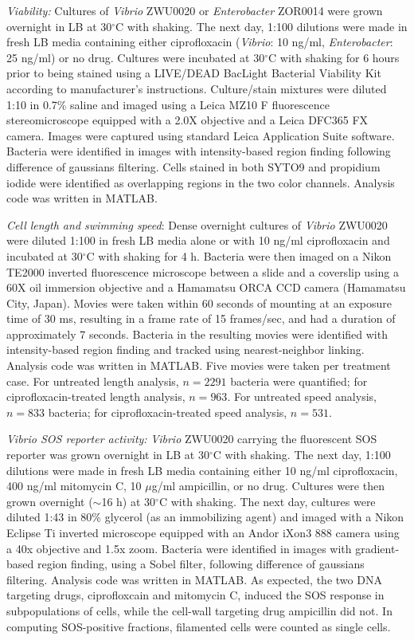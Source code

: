 \documentclass[12pt]{article}
\begin{document}
\textit{Viability:} Cultures of \textit{Vibrio} ZWU0020 or \textit{Enterobacter} ZOR0014 were grown overnight in LB at 30$^{\circ}$C with shaking. The next day, 1:100 dilutions were made in fresh LB media containing either ciprofloxacin (\textit{Vibrio}: 10 ng/ml, \textit{Enterobacter}: 25 ng/ml) or no drug. Cultures were incubated at 30$^{\circ}$C with shaking for 6 hours prior to being stained using a LIVE/DEAD BacLight Bacterial Viability Kit according to manufacturer's instructions. Culture/stain mixtures were diluted 1:10 in 0.7\% saline and imaged using a Leica MZ10 F fluorescence stereomicroscope equipped with a 2.0X objective and a Leica DFC365 FX camera. Images were captured using standard Leica Application Suite software. Bacteria were identified in images with intensity-based region finding following difference of gaussians filtering. Cells stained in both SYTO9 and propidium iodide were identified as overlapping regions in the two color channels. Analysis code was written in MATLAB.

\textit{Cell length and swimming speed}: Dense overnight cultures of \textit{Vibrio} ZWU0020 were diluted 1:100 in fresh LB media alone or with 10 ng/ml ciprofloxacin and incubated at 30$^{\circ}$C with shaking for 4 h. Bacteria were then imaged on a Nikon TE2000 inverted fluorescence microscope between a slide and a coverslip using a 60X oil immersion objective and a Hamamatsu ORCA CCD camera (Hamamatsu City, Japan). Movies were taken within 60 seconds of mounting at an exposure time of 30 ms, resulting in a frame rate of 15 frames/sec, and had a duration of approximately 7 seconds. Bacteria in the resulting movies were identified with intensity-based region finding and tracked using nearest-neighbor linking. Analysis code was written in MATLAB. Five movies were taken per treatment case. For untreated length analysis, $n = 2291$ bacteria were quantified; for ciprofloxacin-treated length analysis, $n = 963$. For untreated speed analysis, $n = 833$ bacteria; for ciprofloxacin-treated speed analysis, $n = 531$.

\textit{Vibrio SOS reporter activity:} \textit{Vibrio} ZWU0020 carrying the fluorescent SOS reporter was grown overnight in LB at 30$^{\circ}$C with shaking. The next day, 1:100 dilutions were made in fresh LB media containing either 10 ng/ml ciprofloxacin, 400 ng/ml mitomycin C, 10 $\mu$g/ml ampicillin, or no drug. Cultures were then grown overnight ($\sim$16 h) at 30$^{\circ}$C with shaking. The next day, cultures were diluted 1:43 in 80\% glycerol (as an immobilizing agent) and imaged with a Nikon Eclipse Ti inverted microscope equipped with an Andor iXon3 888 camera using a 40x objective and 1.5x zoom. Bacteria were identified in images with gradient-based region finding, using a Sobel filter, following difference of gaussians filtering. Analysis code was written in MATLAB. As expected, the two DNA targeting drugs, ciprofloxcain and mitomycin C, induced the SOS response in subpopulations of cells, while the cell-wall targeting drug ampicillin did not. In computing SOS-positive fractions, filamented cells were counted as single cells.
\end{document}
